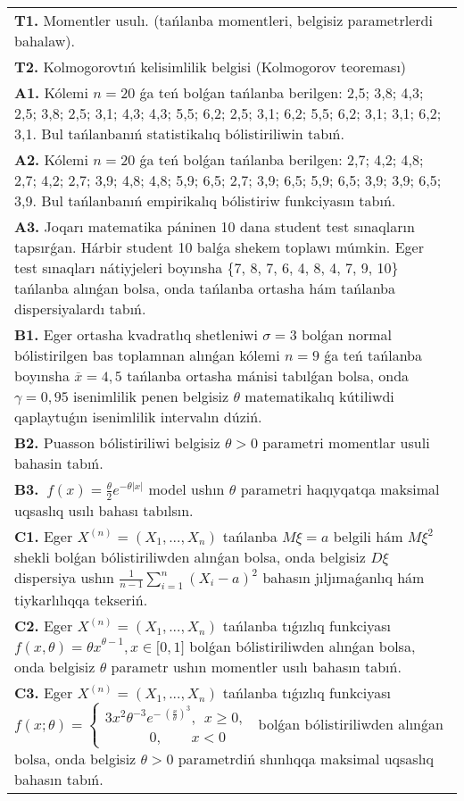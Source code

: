 \documentclass{article}
\begin{document}
\begin{tabular}{m{17cm}}
\textbf{T1.} 
Momentler usulı. (tańlanba momentleri, belgisiz parametrlerdi bahalaw).
 \\
\textbf{T2.} 
Kolmogorovtıń kelisimlilik belgisi (Kolmogorov teoreması)
 \\
\textbf{A1.} 
Kólemi \(n = 20\) ǵa teń bolǵan tańlanba berilgen: 2,5; 3,8; 4,3; 2,5; 3,8; 2,5; 3,1; 4,3; 4,3; 5,5; 6,2; 2,5; 3,1; 6,2; 5,5; 6,2; 3,1; 3,1; 6,2; 3,1. Bul tańlanbanıń statistikalıq bólistiriliwin tabıń.
 \\
\textbf{A2.} 
Kólemi \(n = 20\) ǵa teń bolǵan tańlanba berilgen: 2,7; 4,2; 4,8; 2,7; 4,2; 2,7; 3,9; 4,8; 4,8; 5,9; 6,5; 2,7; 3,9; 6,5; 5,9; 6,5; 3,9; 3,9; 6,5; 3,9. Bul tańlanbanıń empirikalıq bólistiriw funkciyasın tabıń.
 \\
\textbf{A3.} 
Joqarı matematika páninen 10 dana student test sınaqların tapsırǵan. Hárbir student 10 balǵa shekem toplawı múmkin. Eger test sınaqları nátiyjeleri boyınsha \{7, 8, 7, 6, 4, 8, 4, 7, 9, 10\} tańlanba alınǵan bolsa, onda tańlanba ortasha hám tańlanba dispersiyalardı tabıń.
 \\
\textbf{B1.} 
Eger ortasha kvadratlıq shetleniwi \(\sigma = 3\) bolǵan normal bólistirilgen bas toplamnan alınǵan kólemi \(n = 9\) ǵa teń tańlanba boyınsha \(\overline{x} = 4,5\) tańlanba ortasha mánisi tabılǵan bolsa, onda \(\gamma = 0,95\) isenimlilik penen belgisiz \(\theta\) matematikalıq kútiliwdi qaplaytuǵın isenimlilik intervalın dúziń.
 \\
\textbf{B2.} 
Puasson bólistiriliwi belgisiz \(\theta > 0\) parametri momentlar usuli bahasin tabıń.
 \\
\textbf{B3.} 
\(\ f(x) = \frac{\theta}{2}e^{- \theta|x|}\) model ushın \(\theta\) parametri haqıyqatqa maksimal uqsaslıq usılı bahası tabılsın.
 \\
\textbf{C1.} 
Eger \(X^{(n)} = \left( X_{1},...,X_{n} \right)\) tańlanba \(M\xi = a\) belgili hám \(M\xi^{2}\) shekli bolǵan bólistiriliwden alınǵan bolsa, onda belgisiz \(D\xi\) dispersiya ushın \(\frac{1}{n - 1}\sum_{i = 1}^{n}\left( X_{i} - a \right)^{2}\) bahasın jıljımaǵanlıq hám tiykarlılıqqa tekseriń.
 \\
\textbf{C2.} 
Eger \(X^{(n)} = \left( X_{1},...,X_{n} \right)\) tańlanba tıǵızlıq funkciyası
${f(x,\theta) = \theta x}^{\theta - 1},x \in \lbrack 0,1\rbrack$
bolǵan bólistiriliwden alınǵan bolsa, onda belgisiz \(\theta\) parametr ushın momentler usılı bahasın tabıń.
 \\
\textbf{C3.} 
Eger \(X^{(n)} = \left( X_{1},...,X_{n} \right)\) tańlanba tıǵızlıq funkciyası
$f(x;\theta) = \left\{ \begin{matrix}
3x^{2}\theta^{- 3}e^{- \ \left( \frac{x}{\theta} \right)^{3}},\ \ x \geq 0, \\
\ \ \ \ \ \ \ \ \ \ \ \ \ \ 0,\ \ \ \ \ \ \ \ \ x < 0
\end{matrix} \right.\ $
bolǵan bólistiriliwden alınǵan bolsa, onda belgisiz \(\theta > 0\) parametrdiń shınlıqqa maksimal uqsaslıq bahasın tabıń.
 \\

\end{tabular}
\vspace{1cm}
\end{document}
